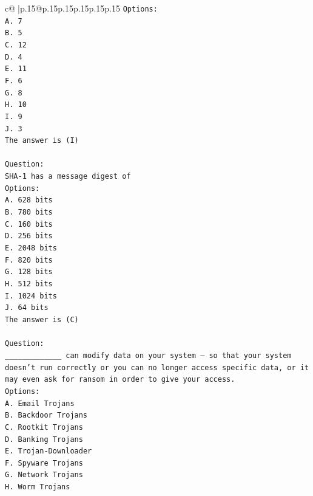 \documentclass{article}
\begin{document}
{\begin{supertabular}{c@{$\;$}|p{.15\linewidth}@{}p{.15\linewidth}p{.15\linewidth}p{.15\linewidth}p{.15\linewidth}p{.15\linewidth}}
{{{\texttt{Options:} \\
\texttt{A. 7} \\
\texttt{B. 5} \\
\texttt{C. 12} \\
\texttt{D. 4} \\
\texttt{E. 11} \\
\texttt{F. 6} \\
\texttt{G. 8} \\
\texttt{H. 10} \\
\texttt{I. 9} \\
\texttt{J. 3} \\
\texttt{The answer is (I)} \\
\\ 
\texttt{Question:} \\
\texttt{SHA{-}1 has a message digest of} \\
\texttt{Options:} \\
\texttt{A. 628 bits} \\
\texttt{B. 780 bits} \\
\texttt{C. 160 bits} \\
\texttt{D. 256 bits} \\
\texttt{E. 2048 bits} \\
\texttt{F. 820 bits} \\
\texttt{G. 128 bits} \\
\texttt{H. 512 bits} \\
\texttt{I. 1024 bits} \\
\texttt{J. 64 bits} \\
\texttt{The answer is (C)} \\
\\ 
\texttt{Question:} \\
\texttt{\_\_\_\_\_\_\_\_\_\_\_\_\_ can modify data on your system – so that your system doesn’t run correctly or you can no longer access specific data, or it may even ask for ransom in order to give your access.} \\
\texttt{Options:} \\
\texttt{A. Email Trojans} \\
\texttt{B. Backdoor Trojans} \\
\texttt{C. Rootkit Trojans} \\
\texttt{D. Banking Trojans} \\
\texttt{E. Trojan{-}Downloader} \\
\texttt{F. Spyware Trojans} \\
\texttt{G. Network Trojans} \\
\texttt{H. Worm Trojans} \\
}}}
\end{supertabular}}
\end{document}
